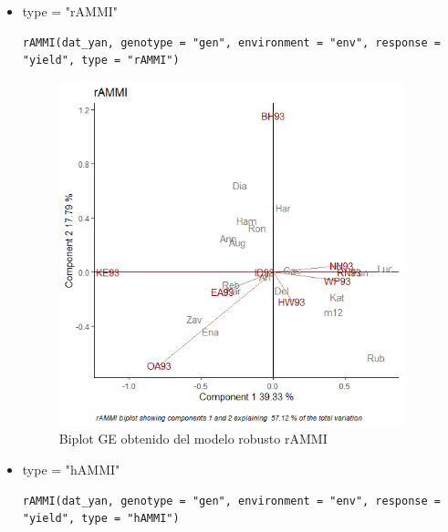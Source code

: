 \begin{itemize}

\item  type = "rAMMI"

\begin{lstlisting}
rAMMI(dat_yan, genotype = "gen", environment = "env", response = "yield", type = "rAMMI")
\end{lstlisting}

\begin{figure}[h]
	\begin{center}
		\includegraphics[width=10cm]{./Graficos/rAMMI.png}
	\end{center}
	\caption{Biplot GE obtenido del modelo robusto rAMMI}
\end{figure}


\item  type = "hAMMI"

\begin{lstlisting}
rAMMI(dat_yan, genotype = "gen", environment = "env", response = "yield", type = "hAMMI")
\end{lstlisting}


\end{itemize}
